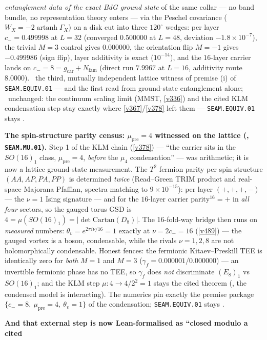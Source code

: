 \documentclass[11pt,a4paper]{article}
\newcommand{\Nfam}{N_{\mathrm{fam}}}
\newcommand{\gcar}{g_{\mathrm{car}}}
\begin{document}
\begin{keybox}
\emph{entanglement data of the exact BdG ground state} of the same collar --- no band bundle, no
representation theory enters --- via the Peschel covariance ($W_X=-2\operatorname{artanh}\Gamma_X$) on a
disk cut into three $120^\circ$ wedges: per layer $c_-=0.499998$ at $L{=}32$ (converged $0.500000$ at
$L{=}48$, deviation $-1.8\times10^{-7}$), the trivial $M{=}3$ control gives $0.000000$, the orientation
flip $M{=}{-}1$ gives $-0.499986$ (sign flip), layer additivity is exact ($10^{-14}$), and the $16$-layer
carrier lands on $c_-=8=\gcar+\Nfam$ (direct run $7.9967$ at $L{=}16$, additivity route $8.0000$). \mE\ the
third, mutually independent lattice witness of premise (i) of \texttt{SEAM.EQUIV.01} --- and the first read
from ground-state entanglement alone; \mO\ unchanged: the continuum scaling limit (MMST, \vref{v336}) and
the cited KLM condensation step stay exactly where \vref{v367}/\vref{v378} left them ---
\texttt{SEAM.EQUIV.01} stays \mO.
\par\smallskip\noindent\textbf{The spin-structure parity census: $\mu_{\mathrm{pre}}{=}4$ witnessed on the
lattice (, \texttt{SEAM.MU.01}).} Step 1 of the KLM chain
(\vref{v378}) --- ``the carrier sits in the $SO(16)_1$ class, $\mu_{\mathrm{pre}}{=}4$, \emph{before} the
$\mu_4$ condensation'' --- was arithmetic; it is now a lattice ground-state measurement. The $T^2$
fermion parity per spin structure $(AA,AP,PA,PP)$ is determined \emph{twice} (Read--Green TRIM product and
real-space Majorana Pfaffian, spectra matching to $9{\times}10^{-15}$): per layer $(+,+,+,-)$ --- the
$\nu{=}1$ Ising signature --- and for the $16$-layer carrier $\mathrm{parity}^{16}={+}$ in \emph{all four}
sectors, so the gauged torus GSD is $4=\mu(SO(16)_1)=|\det\mathrm{Cartan}(D_8)|$. The 16-fold-way bridge
then runs on \emph{measured} numbers: $\theta_v=e^{2\pi i\nu/16}=1$ exactly at $\nu=2c_-=16$ (\vref{v489})
--- the gauged vortex is a boson, condensable, while the rivals $\nu=1,2,8$ are not holomorphically
condensable. Honest fences: the fermionic Kitaev--Preskill TEE is identically zero for \emph{both} $M{=}1$
and $M{=}3$ ($\gamma_f=0.000001/0.000000$) --- an invertible fermionic phase has no TEE, so $\gamma_f$ does
\emph{not} discriminate $(E_8)_1$ vs $SO(16)_1$; and the KLM step $\mu:4\to4/2^2=1$ stays the cited
theorem (\mC, the condensed model is interacting). The numerics pin exactly the premise package
$\{c_-{=}8,\ \mu_{\mathrm{pre}}{=}4,\ \theta_v{=}1\}$ of the condensation; \texttt{SEAM.EQUIV.01} stays \mO.
\par\smallskip\noindent\textbf{And that external step is now Lean-formalised as ``closed modulo a cited
}
\end{keybox}
\end{document}
